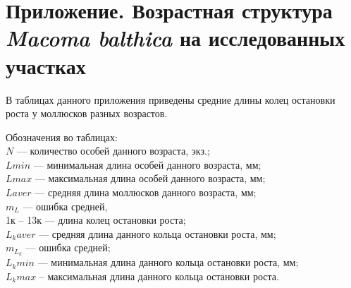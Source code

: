 
\renewcommand{\thetable}{\Roman{table}}

\appendix

\section{Приложение. Возрастная структура {\it Macoma balthica} на исследованных участках}
\label{app:growth_matrix}

В   таблицах данного приложения   приведены средние длины колец остановки роста у моллюсков разных возрастов.

\vspace{5em}

Обозначения во таблицах:\\[2em]
$N$ --- количество  особей  данного возраста, экз.;\\
$L min$  ---  минимальная   длина  особей   данного   возраста,   мм;\\
$L max$   ---   максимальная   длина   особей   данного   возраста,   мм;\\
$L aver$ --- средняя длина моллюсков данного возраста, мм;\\
$m_L$ --- ошибка средней,\\
1к -- 13к --- длина колец остановки роста;\\
$L_k aver$ --- средняя длина данного кольца остановки роста, мм;\\
$m_{L_k}$ --- ошибка средней;\\
$L_k min$ --- минимальная длина данного кольца остановки роста, мм; \\
$L_k   max$   --   максимальная   длина   данного   кольца   остановки   роста.   \\



